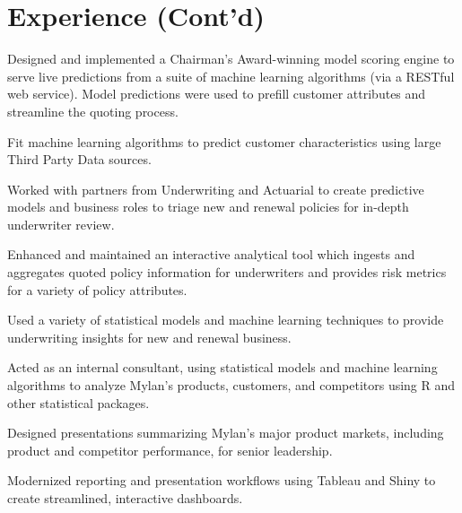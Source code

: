\documentclass[letterpaper]{deedy-resume} %
\begin{document}
\begin{minipage}[t]{0.9\textwidth}

  \section{Experience (Cont'd)}
  \hfill{}
  \hfill
  \vspace{\topsep}
  \begin{tightitemize}  
  \item Designed and implemented a Chairman's Award-winning model
    scoring engine to serve live predictions from a suite of machine
    learning algorithms (via a RESTful web service). Model predictions were used
    to prefill customer attributes and streamline the quoting process.
  \item Fit machine learning algorithms to predict customer characteristics using
    large Third Party Data sources.
  \item Worked with partners from Underwriting and Actuarial to create
    predictive models and business roles to triage new and renewal
    policies for in-depth underwriter review.
  \item Enhanced and maintained an interactive analytical tool which 
    ingests and aggregates quoted policy information for underwriters
    and provides risk metrics for a variety of policy attributes.
  \item Used a variety of statistical models and machine learning techniques to
    provide underwriting insights for new and renewal business.
  \end{tightitemize}
  \sectionspace
  
  \hfill{}
  \hfill{}
  
  \begin{tightitemize}
  \item Acted as an internal consultant, using statistical models and machine
    learning algorithms to 
    analyze Mylan's products, customers, and competitors using R and
    other statistical packages.
  \item Designed presentations summarizing Mylan's major product markets,
    including product and competitor performance, for senior leadership.
  \item Modernized reporting and presentation workflows using Tableau and
    Shiny to create streamlined, interactive dashboards.
  \end{tightitemize}
  \sectionspace %


\end{minipage}
\end{document}
